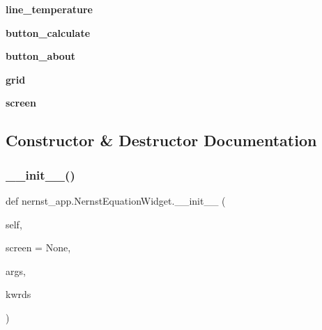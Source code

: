 \begin{DoxyCompactItemize}
\item 
\mbox{\label{classnernst__app_1_1NernstEquationWidget_ac64168fa96edd5eb2a62dc3f593408ff}} 
{\bfseries line\+\_\+temperature}
\item 
\mbox{\label{classnernst__app_1_1NernstEquationWidget_a105200e09f92728ab26decc617570482}} 
{\bfseries button\+\_\+calculate}
\item 
\mbox{\label{classnernst__app_1_1NernstEquationWidget_a6560987bece49d4430d51ba73859967a}} 
{\bfseries button\+\_\+about}
\item 
\mbox{\label{classnernst__app_1_1NernstEquationWidget_a5b98b39672cfcf4b8ee2f4326676f340}} 
{\bfseries grid}
\item 
\mbox{\label{classnernst__app_1_1NernstEquationWidget_a739bfcb9ab887b86eda74adf4ee2ba41}} 
{\bfseries screen}
\end{DoxyCompactItemize}


\subsection{Constructor \& Destructor Documentation}
\mbox{\label{classnernst__app_1_1NernstEquationWidget_a1e2eb76be9caac1773f1599c196c5d64}} 
\subsubsection{\texorpdfstring{\+\_\+\+\_\+init\+\_\+\+\_\+()}{\_\_init\_\_()}}
{\footnotesize\ttfamily def nernst\+\_\+app.\+Nernst\+Equation\+Widget.\+\_\+\+\_\+init\+\_\+\+\_\+ (\begin{DoxyParamCaption}\item[{}]{self,  }\item[{}]{screen = {\ttfamily None},  }\item[{}]{args,  }\item[{}]{kwrds }\end{DoxyParamCaption})}

